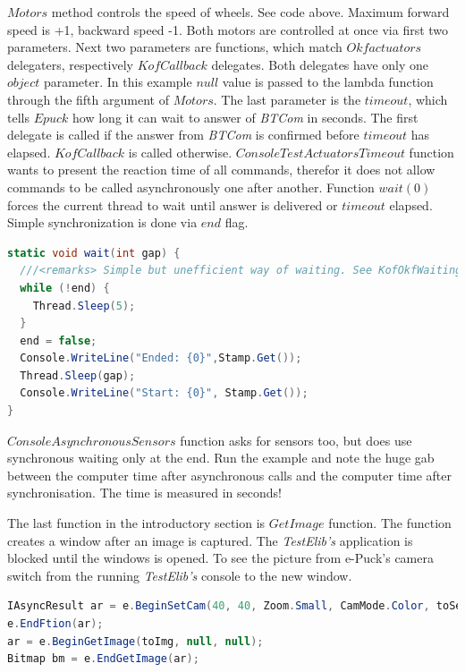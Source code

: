   $Motors$ method controls the speed of wheels. See code above. Maximum forward speed is +1, backward speed -1. 
  Both motors are controlled at once via first two parameters.
  Next two parameters are functions, which match $Okfactuators$ delegaters,
  respectively $KofCallback$ delegates. 
  Both delegates have only one $object$ parameter. In this example $null$ value is passed
  to the lambda function through the fifth argument of $Motors$. The last parameter is the $timeout$, 
  which tells $Epuck$ how long it can wait to answer of {\it BTCom} in seconds.
  The first delegate is called if the answer from {\it BTCom} is confirmed 
  before $timeout$ has elapsed. 
  $KofCallback$ is called otherwise.
  $ConsoleTestActuatorsTimeout$ function wants to present the reaction time of all commands, 
  therefor it does not allow commands to be called asynchronously one after another.
  Function $wait(0)$ forces the current thread to wait until answer is delivered
  or $timeout$ elapsed. Simple synchronization is done via $end$ flag.
\begin{lstlisting}[language=cs]
static void wait(int gap) {
  ///<remarks> Simple but unefficient way of waiting. See KofOkfWaiting(..) in Behaviour for usage of EventWaitHandle.</remarks>
  while (!end) { 
    Thread.Sleep(5); 
  } 
  end = false; 
  Console.WriteLine("Ended: {0}",Stamp.Get());
  Thread.Sleep(gap);
  Console.WriteLine("Start: {0}", Stamp.Get());
}
\end{lstlisting}

  $ConsoleAsynchronousSensors$ function asks for sensors too, but does use synchronous waiting only at the end. Run the example and note the huge gab
  between the computer time after asynchronous calls and the computer time after synchronisation. 
  The time is measured in seconds!
  
  The last function in the introductory section is $GetImage$ function. 
  The function creates a window after an image is captured. 
  The {\it TestElib's} application is blocked until the windows is opened. To see the picture from
  e-Puck's camera switch from the running {\it TestElib's} console to the new window.


\begin{lstlisting}[language=cs]
IAsyncResult ar = e.BeginSetCam(40, 40, Zoom.Small, CamMode.Color, toSetCam, null, null);
e.EndFtion(ar);
ar = e.BeginGetImage(toImg, null, null);
Bitmap bm = e.EndGetImage(ar);	
\end{lstlisting}


